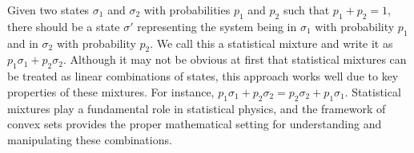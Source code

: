 


Given two states $\sigma_1$ and $\sigma_2$ with probabilities $p_1$ and $p_2$ such that $p_1 + p_2 = 1$, there should be a state $\sigma'$ representing the system being in $\sigma_1$ with probability $p_1$ and in $\sigma_2$ with probability $p_2$. We call this a statistical mixture and write it as $p_1 \sigma_1 + p_2 \sigma_2$. Although it may not be obvious at first that statistical mixtures can be treated as linear combinations of states, this approach works well due to key properties of these mixtures. For instance, $p_1 \sigma_1 + p_2 \sigma_2 = p_2 \sigma_2 + p_1 \sigma_1$. Statistical mixtures play a fundamental role in statistical physics, and the framework of convex sets provides the proper mathematical setting for understanding and manipulating these combinations.



